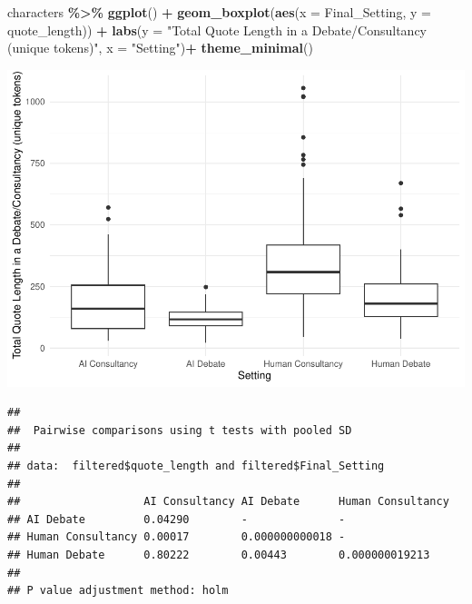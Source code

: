 \documentclass[
]{article}
\newenvironment{Shaded}{\begin{snugshade}}{\end{snugshade}}
\newcommand{\AttributeTok}[1]{\textcolor[rgb]{0.13,0.29,0.53}{#1}}
\newcommand{\FunctionTok}[1]{\textcolor[rgb]{0.13,0.29,0.53}{\textbf{#1}}}
\newcommand{\NormalTok}[1]{#1}
\newcommand{\SpecialCharTok}[1]{\textcolor[rgb]{0.81,0.36,0.00}{\textbf{#1}}}
\newcommand{\StringTok}[1]{\textcolor[rgb]{0.31,0.60,0.02}{#1}}
\begin{document}
\begin{Shaded}
\begin{Highlighting}[]
\NormalTok{characters }\SpecialCharTok{\%\textgreater{}\%}
  \FunctionTok{ggplot}\NormalTok{() }\SpecialCharTok{+}
  \FunctionTok{geom\_boxplot}\NormalTok{(}\FunctionTok{aes}\NormalTok{(}\AttributeTok{x =}\NormalTok{ Final\_Setting, }\AttributeTok{y =}\NormalTok{ quote\_length)) }\SpecialCharTok{+}
  \FunctionTok{labs}\NormalTok{(}\AttributeTok{y =} \StringTok{"Total Quote Length in a Debate/Consultancy (unique tokens)"}\NormalTok{, }\AttributeTok{x =} \StringTok{"Setting"}\NormalTok{)}\SpecialCharTok{+}
  \FunctionTok{theme\_minimal}\NormalTok{()}
\end{Highlighting}
\end{Shaded}

\includegraphics[width=1\linewidth]{debate-2309_files/figure-latex/quote_length graph-4}

\begin{Shaded}
\end{Shaded}

\begin{verbatim}
## 
##  Pairwise comparisons using t tests with pooled SD 
## 
## data:  filtered$quote_length and filtered$Final_Setting 
## 
##                   AI Consultancy AI Debate      Human Consultancy
## AI Debate         0.04290        -              -                
## Human Consultancy 0.00017        0.000000000018 -                
## Human Debate      0.80222        0.00443        0.000000019213   
## 
## P value adjustment method: holm
\end{verbatim}
\end{document}
